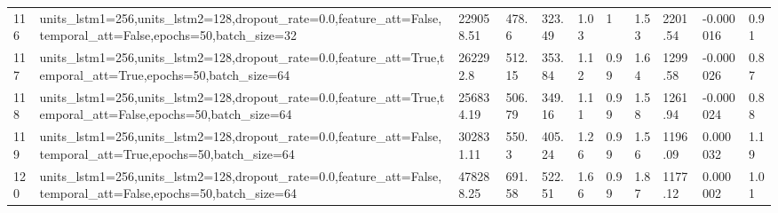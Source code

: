 \begin{longtable}{C{0.8cm} L{2cm} C{1.15cm} C{1.15cm} C{1.15cm} C{1.15cm} C{0.85cm} C{1.25cm} C{1.2cm} C{1.5cm} C{1.0cm}}
116 & units\_lstm1=256,\newline units\_lstm2=128,\newline dropout\_rate=0.0,\newline feature\_att=False,\newline temporal\_att=False,\newline epochs=50,\newline batch\_size=32 & 229058.51 & 478.6 & 323.49 & 1.03 & 1 & 1.53 & 2201.54 & -0.000016 & 0.91 \\
117 & units\_lstm1=256,\newline units\_lstm2=128,\newline dropout\_rate=0.0,\newline feature\_att=True,\newline temporal\_att=True,\newline epochs=50,\newline batch\_size=64 & 262292.8 & 512.15 & 353.84 & 1.12 & 0.99 & 1.64 & 1299.58 & -0.000026 & 0.87 \\
118 & units\_lstm1=256,\newline units\_lstm2=128,\newline dropout\_rate=0.0,\newline feature\_att=True,\newline temporal\_att=False,\newline epochs=50,\newline batch\_size=64 & 256834.19 & 506.79 & 349.16 & 1.11 & 0.99 & 1.58 & 1261.94 & -0.000024 & 0.88 \\
119 & units\_lstm1=256,\newline units\_lstm2=128,\newline dropout\_rate=0.0,\newline feature\_att=False,\newline temporal\_att=True,\newline epochs=50,\newline batch\_size=64 & 302831.11 & 550.3 & 405.24 & 1.26 & 0.99 & 1.56 & 1196.09 & 0.000032 & 1.19 \\
120 & units\_lstm1=256,\newline units\_lstm2=128,\newline dropout\_rate=0.0,\newline feature\_att=False,\newline temporal\_att=False,\newline epochs=50,\newline batch\_size=64 & 478288.25 & 691.58 & 522.51 & 1.66 & 0.99 & 1.87 & 1177.12 & 0.000002 & 1.01 \\

\end{longtable}

